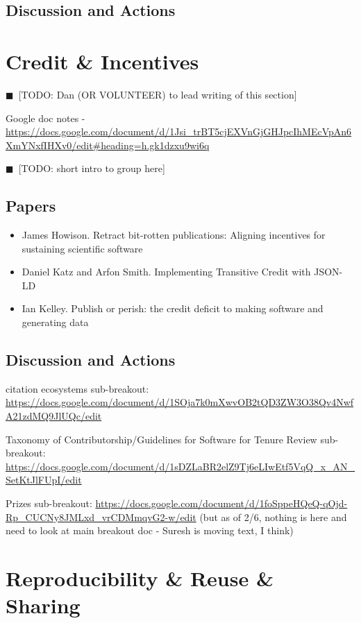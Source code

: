 \documentclass[11pt, oneside]{amsart}
\newcommand{\todo}[1]{{\color{blue}$\blacksquare$~\textsf{[TODO: #1]}}}
\begin{document}
\subsection{Discussion and Actions}

\section{Credit \& Incentives}

\todo{Dan (OR VOLUNTEER) to lead writing of this section}

Google doc notes - \url{https://docs.google.com/document/d/1Jsi_trBT5cjEXVnGjGHJpcIhMEcVpAn6XmYNxfIHXv0/edit#heading=h.gk1dzxu9wi6q}



\todo{short intro to group here}

\subsection{Papers}

\begin{itemize}
\item James Howison. Retract bit-rotten publications: Aligning incentives for sustaining scientific software~\cite{wssspe2_howison}
\item Daniel Katz and Arfon Smith. Implementing Transitive Credit with {JSON-LD}~\cite{wssspe2_katz}
\item Ian Kelley. Publish or perish: the credit deficit to making software and generating data~\cite{wssspe2_kelley}
\end{itemize}

\subsection{Discussion and Actions}

citation ecosystems sub-breakout: \url{https://docs.google.com/document/d/1SOja7k0mXwvOB2tQD3ZW3O38Qv4NwfA21zdMQ9JlUQc/edit}

Taxonomy of Contributorship/Guidelines for Software for Tenure Review sub-breakout: \url{https://docs.google.com/document/d/1sDZLaBR2elZ9Tj6eLIwEtf5VqQ_x_AN_SetKtJlFUpI/edit}

Prizes sub-breakout: \url{https://docs.google.com/document/d/1foSppeHQeQ-qOjd-Rp_CUCNy8JMLxd_vrCDMmqvG2-w/edit} (but as of 2/6, nothing is here and need to look at main breakout doc - Suresh is moving text, I think)

\section{Reproducibility \& Reuse \& Sharing}
\end{document}

